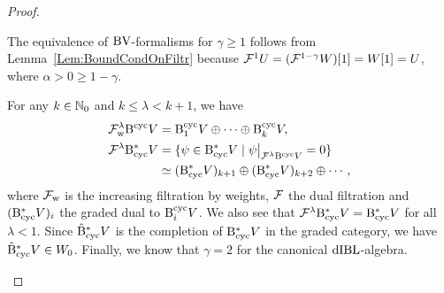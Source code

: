 \documentclass[\MainFolder/Text.tex]{subfiles}
\begin{document}
\begin{proof}
\begin{ProofList}
The equivalence of $\mathrm{BV}$-formalisms for $\gamma\ge 1$ follows from Lemma~\ref{Lem:BoundCondOnFiltr} because $\mathcal{F}^{1} U = (\mathcal{F}^{1-\gamma} W)[1] = W[1] = U$, where $\alpha>0 \ge 1-\gamma$.
\item For any $k\in \mathbb{N}_0$ and $k \le \lambda < k+1$, we have
\begin{align*}
\Filtr^\lambda_{\WeightMRM} \BCyc V &= \BCyc_1 V \oplus \dotsb \oplus \BCyc_k V, \\
\Filtr^\lambda \DBCyc V &= \{ \psi \in \DBCyc V \mid \Restr{\psi}{\Filtr^\lambda \BCyc V} = 0\} \\
& \simeq (\DBCyc V)_{k+1} \oplus (\DBCyc V)_{k+2} \oplus \dotsb,
\end{align*}
where $\mathcal{F}_{\mathrm{w}}$ is the increasing filtration by weights, $\mathcal{F}$ the dual filtration and $(\mathrm{B}_{\mathrm{cyc}}^* V)_{i}$  the graded dual to $\mathrm{B}^{\mathrm{cyc}}_i V$. We also see that $\mathcal{F}^\lambda \mathrm{B}_{\mathrm{cyc}}^* V = \mathrm{B}_{\mathrm{cyc}}^* V$ for all $\lambda<1$. Since $\hat{\mathrm{B}}_{\mathrm{cyc}}^* V$ is the completion of $\mathrm{B}_{\mathrm{cyc}}^* V$ in the graded category, we have $\hat{\mathrm{B}}_{\mathrm{cyc}}^* V\in W_0$. Finally, we know that $\gamma = 2$ for the canonical $\mathrm{dIBL}$-algebra.\qedhere
\end{ProofList}
%
\end{proof}
%
%
%
\end{document}
